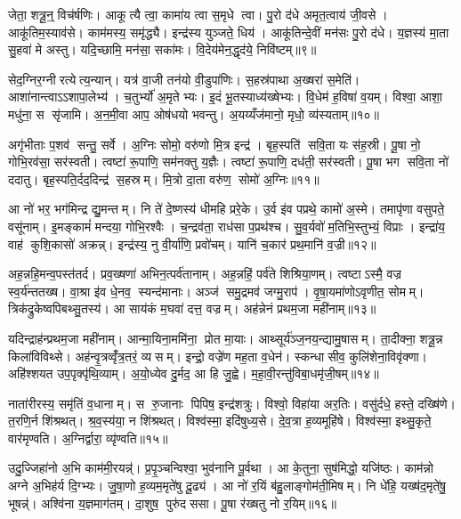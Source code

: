 जेता॒ शत्रू॒न्॒ विच॑र्\mbox{}षणिः। आकूत्यै त्वा॒ कामा॑य त्वा स॒मृधे त्वा। पु॒रो द॑धे अमृत॒त्वाय॑ जी॒वसे। आकू॑तिम॒स्याव॑से। काम॑मस्य॒ समृ॑द्ध्यै। इन्द्र॑स्य युञ्जते॒ धिय॑। आकू॑तिन्दे॒वीं मन॑सः पु॒रो द॑धे। य॒ज्ञस्य॑ मा॒ता सु॒हवा॑ मे अस्तु। यदि॒च्छामि॒ मन॑सा॒ सका॑मः। वि॒देय॑मेन॒द्धृद॑ये॒ निवि॑ष्टम्॥९॥

सेद॒ग्निर॒ग्नीरत्येत्य॒न्यान्। यत्र॑ वा॒जी तन॑यो वी॒डुपा॑णिः। स॒हस्र॑पाथा अ॒ख्षरा॑ स॒मेति॑। आशा॑नान्त्वाऽऽशापा॒लेभ्य॑। च॒तुर्भ्यो॑ अ॒मृतेभ्यः। इ॒दं भू॒तस्याध्य॑ख्षेभ्यः। वि॒धेम॑ ह॒विषा॑ व॒यम्। विश्वा॒ आशा॒ मधु॑ना॒ स सृ॑जामि। अ॒न॒मी॒वा आप॒ ओष॑धयो भवन्तु। अ॒यय्यँज॑मानो॒ मृधो॒ व्य॑स्यताम्॥१०॥

अगृ॑भीताः प॒शव॑ सन्तु॒ सर्वे। अ॒ग्निः सोमो॒ वरु॑णो मि॒त्र इन्द्र॑। बृह॒स्पति॑ सवि॒ता यः स॑ह॒स्री। पू॒षा नो॒ गोभि॒रव॑सा॒ सर॑स्वती। त्वष्टा॑ रू॒पाणि॒ सम॑नक्तु य॒ज्ञैः। त्वष्टा॑ रू॒पाणि॒ दध॑ती॒ सर॑स्वती। पू॒षा भग सवि॒ता नो॑ ददातु। बृह॒स्पति॒र्दद॒दिन्द्र॑ स॒हस्रम्। मि॒त्रो दा॒ता वरु॑ण॒ सोमो॑ अ॒ग्निः॥११॥\anuvakamend[क॒र॒न्निवि॑ष्टमस्यता॒न्नव॑ च]

आ नो॑ भर॒ भग॑मिन्द्र द्यु॒मन्तम्। नि ते॑ दे॒ष्णस्य॑ धीमहि प्ररे॒के। उ॒र्व इ॑व पप्रथे॒ कामो॑ अ॒स्मे। तमापृ॑णा वसुपते॒ वसू॑नाम्। इ॒मङ्कामं॑ मन्दया॒ गोभि॒रश्वैः। च॒न्द्रव॑ता॒ राध॑सा प॒प्रथ॑श्च। सु॒व॒र्यवो॑ म॒तिभि॒स्तुभ्यं॒ विप्राः। इन्द्रा॑य॒ वाह॑ कुशि॒कासो॑ अक्रन्न्। इन्द्र॑स्य॒ नु वी॒र्या॑णि॒ प्रवो॑चम्। यानि॑ च॒कार॑ प्रथ॒मानि॑ व॒ज्री॥१२॥

अह॒न्नहि॒मन्व॒पस्त॑तर्द। प्रव॒ख्षणा॑ अभिन॒त्पर्व॑तानाम्। अह॒न्नहिं॒ पर्व॑ते शिश्रिया॒णम्। त्वष्टाऽस्मै॒ वज्र स्व॒र्य॑न्ततख्ष। वा॒श्रा इ॑व धे॒नव॒ स्यन्द॑मानाः। अञ्ज॑ समु॒द्रमव॑ जग्मु॒राप॑। वृ॒षा॒यमा॑णोऽवृणीत॒ सोमम्। त्रिक॑द्रुकेष्वपिबथ्सु॒तस्य॑। आ साय॑कं म॒घवा॑ दत्त॒ वज्रम्। अह॑न्नेनं प्रथम॒जा मही॑नाम्॥१३॥

यदिन्द्राह॑न्प्रथम॒जा मही॑नाम्। आन्मा॒यिना॒ममि॑ना॒ प्रोत मा॒याः। आथ्सूर्य॑ञ्ज॒नय॒न्द्यामु॒षासम्। ता॒दीक्ना॒ शत्रू॒न्न किला॑विविथ्से। अह॑न्वृ॒त्रव्वृँ॑त्र॒तरं॒ व्यसम्। इन्द्रो॒ वज्रे॑ण मह॒ता व॒धेन॑। स्कन्धासीव॒ कुलि॑शेना॒विवृ॑क्णा। अहि॑श्शयत उप॒पृक्पृ॑थि॒व्याम्। अ॒यो॒ध्येव दु॒र्मद॒ आ हि जु॒ह्वे। म॒हा॒वी॒रन्तु॑विबा॒धमृ॑जी॒षम्॥१४॥

नाता॑रीरस्य॒ समृ॑तिं व॒धानाम्। स रु॒जानाः पिपिष॒ इन्द्र॑शत्रुः। विश्वो॒ विहा॑या अर॒तिः। वसु॑र्दधे॒ हस्ते॒ दख्षि॑णे। त॒रणि॒र्न शि॑श्रथत्। श्र॒व॒स्य॑या॒ न शि॑श्रथत्। विश्व॑स्मा॒ इदि॑षुध्य॒से। दे॒व॒त्रा ह॒व्यमूहि॑षे। विश्व॑स्मा॒ इथ्सु॒कृते॒ वार॑मृण्वति। अ॒ग्निर्द्वारा॒ व्यृ॑ण्वति॥१५॥

उदु॒ज्जिहा॑नो अ॒भि काम॑मी॒रयन्न्॑। प्र॒पृ॒ञ्चन्विश्वा॒ भुव॑नानि पू॒र्वथा। आ के॒तुना॒ सुष॑मिद्धो॒ यजि॑ष्ठः। काम॑न्नो अग्ने अ॒भिह॑र्य दि॒ग्भ्यः। जु॒षा॒णो ह॒व्यम॒मृते॑षु दू॒ढ्य॑। आ नो॑ र॒यिं ब॑हु॒लाङ्गोम॑ती॒मिषम्। नि धे॑हि॒ यख्ष॑द॒मृते॑षु॒ भूषन्न्॑। अश्वि॑ना य॒ज्ञमाग॑तम्। दा॒शुष॒ पुरु॑दससा। पू॒षा र॑ख्षतु नो र॒यिम्॥१६॥

